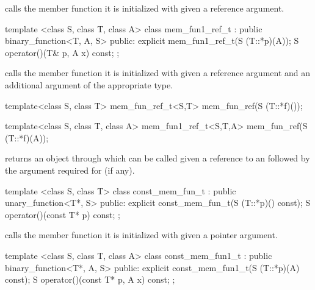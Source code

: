 \begin{itemdescr}
\pnum
{} calls the member function it is initialized with given
a reference argument.
\end{itemdescr}

%
\begin{itemdecl}
  template <class S, class T, class A> class mem_fun1_ref_t
        : public binary_function<T, A, S> {
  public:
    explicit mem_fun1_ref_t(S (T::*p)(A));
    S operator()(T& p, A x) const;
};
\end{itemdecl}

\begin{itemdescr}
\pnum
{} calls the member function it is initialized with
given a reference argument and an additional argument of the appropriate type.
\end{itemdescr}

%
\begin{itemdecl}
  template<class S, class T> mem_fun_ref_t<S,T>
     mem_fun_ref(S (T::*f)());

  template<class S, class T, class A> mem_fun1_ref_t<S,T,A>
     mem_fun_ref(S (T::*f)(A));
\end{itemdecl}

\begin{itemdescr}
\pnum
{} returns an object through which 
can be called given a reference to an  followed by the argument
required for  (if any).
\end{itemdescr}

%
\begin{itemdecl}
template <class S, class T> class const_mem_fun_t
      : public unary_function<T*, S> {
public:
  explicit const_mem_fun_t(S (T::*p)() const);
  S operator()(const T* p) const;
};
\end{itemdecl}

\begin{itemdescr}
\pnum
{} calls the member function it is initialized with
given a pointer argument.
\end{itemdescr}

%
\begin{itemdecl}
template <class S, class T, class A> class const_mem_fun1_t
      : public binary_function<T*, A, S> {
public:
  explicit const_mem_fun1_t(S (T::*p)(A) const);
  S operator()(const T* p, A x) const;
};
\end{itemdecl}


